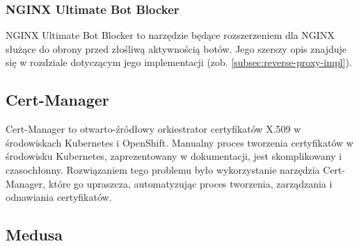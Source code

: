 \subsubsection{NGINX Ultimate Bot Blocker}

NGINX Ultimate Bot Blocker to narzędzie będące rozszerzeniem dla NGINX służące do obrony przed złośliwą aktywnością botów.
Jego szerszy opis znajduje się w rozdziale dotyczącym jego implementacji (zob. \autoref{subsec:reverse-proxy-impl}).

\subsection{Cert-Manager}\label{subsec:cert-manager}

Cert-Manager to otwarto-źródłowy orkiestrator certyfikatów X.509 w środowiskach Kubernetes i OpenShift\cite{cert-manager-home}.
Manualny proces tworzenia certyfikatów w środowisku Kubernetes, zaprezentowany w dokumentacji\cite{kubernetes-generate-certificates-manually}, jest skomplikowany i czasochłonny.
Rozwiązaniem tego problemu było wykorzystanie narzędzia Cert-Manager, które go upraszcza, automatyzując proces tworzenia, zarządzania i odnawiania certyfikatów.

%

%
%
%

\subsection{Medusa}\label{subsec:medusa}

